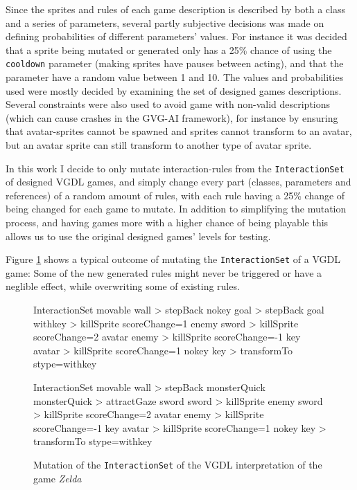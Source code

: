 \documentclass[a4paper,titlepage,final]{report}
\begin{document}
Since the sprites and rules of each game description is described by both a class and a series of parameters, several partly subjective decisions was made on defining probabilities of different parameters' values.
For instance it was decided that a sprite being mutated or generated only has a 25\% chance of using the \texttt{cooldown} parameter (making sprites have pauses between acting), and that the parameter have a random value between 1 and 10.
The values and probabilities used were mostly decided by examining the set of designed games descriptions.
Several constraints were also used to avoid game with non-valid descriptions (which can cause crashes in the GVG-AI framework), for instance by ensuring that avatar-sprites cannot be spawned and sprites cannot transform to an avatar, but an avatar sprite can still transform to another type of avatar sprite.

In this work I decide to only mutate interaction-rules from the \texttt{InteractionSet} of designed VGDL games, and simply change every part (classes, parameters and references) of a random amount of rules, with each rule having a 25\% change of being changed for each game to mutate.
In addition to simplifying the mutation process, and having games more with a higher chance of being playable this allows us to use the original designed games' levels for testing.

Figure \ref{fig:mutatedzelda} shows a typical outcome of mutating the \texttt{InteractionSet} of a VGDL game: Some of the new generated rules might never be triggered or have a neglible effect, while overwriting some of existing rules.


\begin{figure}[!ht]
\centering
\begin{vgdldesc}[linewidth=14cm]
InteractionSet
	movable wall  > stepBack
	nokey goal    > stepBack
	goal withkey  > killSprite scoreChange=1
	enemy sword > killSprite scoreChange=2
	avatar enemy > killSprite scoreChange=-1
	key  avatar   > killSprite scoreChange=1
	nokey key     > transformTo stype=withkey  

InteractionSet
	movable wall > stepBack
	monsterQuick monsterQuick > attractGaze
	sword sword > killSprite
	enemy sword > killSprite scoreChange=2
	avatar enemy > killSprite scoreChange=-1
	key avatar > killSprite scoreChange=1
	nokey key > transformTo stype=withkey
\end{vgdldesc}
\caption{Mutation of the \texttt{InteractionSet} of the VGDL interpretation of the game \textit{Zelda}}
\label{fig:mutatedzelda}
\end{figure}
\end{document}
